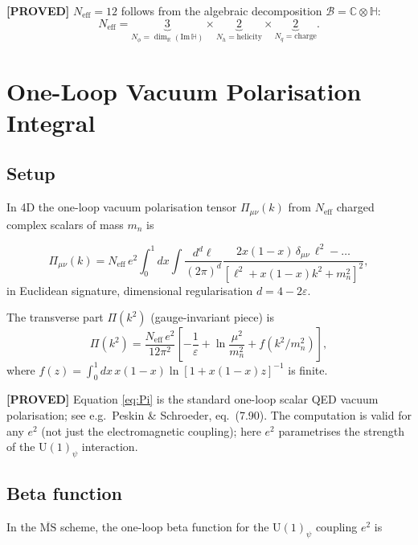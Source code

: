 \documentclass[11pt,a4paper]{article}
\newcommand{\proved}[1]{\textbf{[PROVED]} #1}
\begin{document}
\proved{$N_\mathrm{eff} = 12$ follows from the algebraic decomposition
$\mathcal{B} = \mathbb{C}\otimes\mathbb{H}$:
\[
  N_\mathrm{eff} = \underbrace{3}_{N_\phi = \dim_\mathbb{R}(\mathrm{Im}\,\mathbb{H})}
                 \times \underbrace{2}_{N_h = \text{helicity}}
                 \times \underbrace{2}_{N_q = \text{charge}}.
\]}

\section{One-Loop Vacuum Polarisation Integral}

\subsection{Setup}

In 4D the one-loop vacuum polarisation tensor $\Pi_{\mu\nu}(k)$ from $N_\mathrm{eff}$
charged complex scalars of mass $m_n$ is

\begin{equation}
  \label{eq:vac_pol}
  \Pi_{\mu\nu}(k)
  = N_\mathrm{eff}\,e^2 \int_0^1 dx \int \frac{d^d\ell}{(2\pi)^d}
    \frac{2x(1-x)\,\delta_{\mu\nu}\,\ell^2 - \ldots}
         {[\ell^2 + x(1-x)k^2 + m_n^2]^2},
\end{equation}
in Euclidean signature, dimensional regularisation $d = 4 - 2\varepsilon$.

The transverse part $\Pi(k^2)$ (gauge-invariant piece) is
\begin{equation}
  \label{eq:Pi}
  \Pi(k^2)
  = \frac{N_\mathrm{eff}\,e^2}{12\pi^2}
    \left[-\frac{1}{\varepsilon} + \ln\frac{\mu^2}{m_n^2} + f(k^2/m_n^2)\right],
\end{equation}
where $f(z) = \int_0^1 dx\,x(1-x)\ln[1 + x(1-x)z]^{-1}$ is finite.

\proved{Equation \eqref{eq:Pi} is the standard one-loop scalar QED vacuum
polarisation; see e.g.\ Peskin \& Schroeder, eq.\ (7.90).  The computation is
valid for any $e^2$ (not just the electromagnetic coupling); here $e^2$
parametrises the strength of the $\mathrm{U}(1)_\psi$ interaction.}

\subsection{Beta function}

In the $\overline{\mathrm{MS}}$ scheme, the one-loop beta function for the
$\mathrm{U}(1)_\psi$ coupling $e^2$ is
\end{document}
